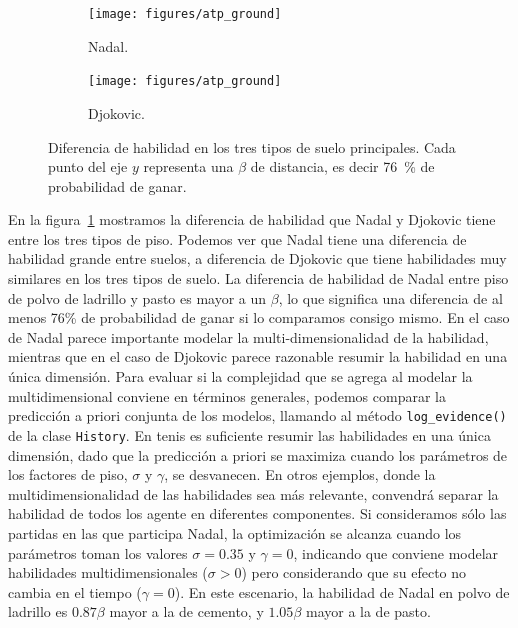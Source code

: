 \documentclass[a4paper,11pt]{book}
\theoremstyle{definition}
\begin{document}
\begin{figure}[ht!]
    \centering
    \begin{subfigure}[t]{0.48\textwidth}
    \texttt{[image: figures/atp\_ground]}
    \caption{Nadal.}
    \end{subfigure}
    \begin{subfigure}[t]{0.48\textwidth}
    \texttt{[image: figures/atp\_ground]}
    \caption{Djokovic.}
    \end{subfigure}
    \caption{
    Diferencia de habilidad en los tres tipos de suelo principales.
    Cada punto del eje $y$ representa una $\beta$ de distancia, es decir \SI{76}{\percent} de probabilidad de ganar.
    }
    \label{fig:atp_ground}
\end{figure}
%
En la figura~\ref{fig:atp_ground} mostramos la diferencia de habilidad que Nadal y Djokovic tiene entre los tres tipos de piso.
%
Podemos ver que Nadal tiene una diferencia de habilidad grande entre suelos, a diferencia de Djokovic que tiene habilidades muy similares en los tres tipos de suelo.
%
La diferencia de habilidad de Nadal entre piso de polvo de ladrillo y pasto es mayor a un $\beta$, lo que significa una diferencia de al menos 76\% de probabilidad de ganar si lo comparamos consigo mismo.
%
En el caso de Nadal parece importante modelar la multi-dimensionalidad de la habilidad, mientras que en el caso de Djokovic parece razonable resumir la habilidad en una \'unica dimensi\'on.
%
Para evaluar si la complejidad que se agrega al modelar la multidimensional conviene en términos generales, podemos comparar la predicci\'on a priori conjunta de los modelos, llamando al método \texttt{log\_evidence()} de la clase \texttt{History}.
En tenis es suficiente resumir las habilidades en una \'unica dimensi\'on, dado que la predicci\'on a priori se maximiza cuando los parámetros de los factores de piso, $\sigma$ y $\gamma$, se desvanecen.
%
En otros ejemplos, donde la multidimensionalidad de las habilidades sea más relevante, convendrá separar la habilidad de todos los agente en diferentes componentes.
%
Si consideramos s\'olo las partidas en las que participa Nadal, la optimizaci\'on se alcanza cuando los parámetros toman los valores $\sigma=0.35$ y $\gamma=0$, indicando que conviene modelar habilidades multidimensionales ($\sigma>0$) pero considerando que su efecto no cambia en el tiempo ($\gamma = 0$).
%
En este escenario, la habilidad de Nadal en polvo de ladrillo es $0.87\beta$ mayor a la de cemento, y $1.05\beta$ mayor a la de pasto.
\end{document}
